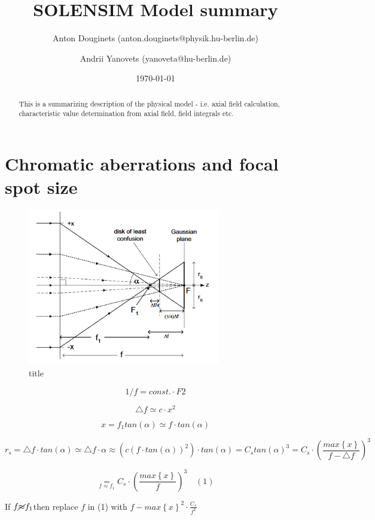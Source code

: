\documentclass[a4paper,12pt]{article}
\title{SOLENSIM Model summary}
\author{Anton Douginets (anton.douginets@physik.hu-berlin.de)
	\and
	Andrii Yanovets (yanoveta@hu-berlin.de)}
\date{\today}
\begin{document}
\thispagestyle{empty}
\maketitle

\begin{abstract}
This is a summarizing description of the physical model - i.e. axial field calculation, characteristic value determination from axial field, field integrals etc.
\end{abstract}

\tableofcontents

\newpage


\section{Chromatic aberrations and focal spot size}

\begin{figure}
  \centering
  \includegraphics[width=0.75\textwidth]{cs_illustration}
  \caption{title}
\end{figure}

\[
1/f=const.\cdotp F2
\]

\[
\triangle f\simeq c\cdotp x^{2}
\]

\[
x=f_{1}tan\left(\alpha\right)\simeq f\cdotp tan\left(\alpha\right)
\]

\[
r_{s}=\triangle f\cdotp tan\left(\alpha\right)\simeq\triangle f\cdotp\alpha\approx\left(c\left(f\cdotp tan\left(\alpha\right)\right)^{2}\right)\cdotp tan\left(\alpha\right)=C_{s}tan\left(\alpha\right)^{3}=C_{s}\cdotp\left(\frac{max\left\{ x\right\} }{f-\triangle f}\right)^{3}
\]

\[
\underset{f\approx f_{1}}{=}C_{s}\cdotp\left(\frac{max\left\{ x\right\} }{f}\right)^{3}\quad(1)
\]

If $f\cancel{\approx}f_{1}$then replace $f$ in (1) with $f-max\left\{ x\right\} ^{2}\cdotp\frac{C_{s}}{f^{2}}$

\printbibliography


\end{document}

